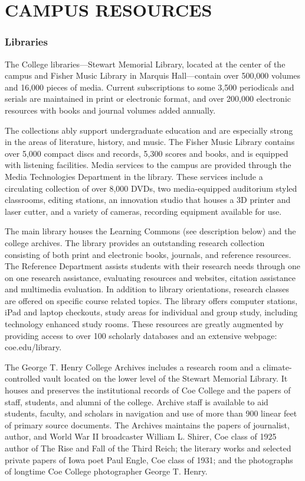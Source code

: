 \documentclass[
  letterpaper,
]{scrbook}
\begin{document}
\hypertarget{campus-resources-1}{%
\chapter{CAMPUS RESOURCES}\label{campus-resources-1}}

\hypertarget{libraries}{%
\subsection{Libraries}\label{libraries}}

The College libraries---Stewart Memorial Library, located at the center
of the campus and Fisher Music Library in Marquis Hall---contain over
500,000 volumes and 16,000 pieces of media. Current subscriptions to
some 3,500 periodicals and serials are maintained in print or electronic
format, and over 200,000 electronic resources with books and journal
volumes added annually.

The collections ably support undergraduate education and are especially
strong in the areas of literature, history, and music. The Fisher Music
Library contains over 5,000 compact discs and records, 5,300 scores and
books, and is equipped with listening facilities. Media services to the
campus are provided through the Media Technologies Department in the
library. These services include a circulating collection of over 8,000
DVDs, two media-equipped auditorium styled classrooms, editing stations,
an innovation studio that houses a 3D printer and laser cutter, and a
variety of cameras, recording equipment available for use.

The main library houses the Learning Commons (see description below) and
the college archives. The library provides an outstanding research
collection consisting of both print and electronic books, journals, and
reference resources. The Reference Department assists students with
their research needs through one on one research assistance, evaluating
resources and websites, citation assistance and multimedia evaluation.
In addition to library orientations, research classes are offered on
specific course related topics. The library offers computer stations,
iPad and laptop checkouts, study areas for individual and group study,
including technology enhanced study rooms. These resources are greatly
augmented by providing access to over 100 scholarly databases and an
extensive webpage: coe.edu/library.

The George T. Henry College Archives includes a research room and a
climate-controlled vault located on the lower level of the Stewart
Memorial Library. It houses and preserves the institutional records of
Coe College and the papers of staff, students, and alumni of the
college. Archive staff is available to aid students, faculty, and
scholars in navigation and use of more than 900 linear feet of primary
source documents. The Archives maintains the papers of journalist,
author, and World War II broadcaster William L. Shirer, Coe class of
1925 author of The Rise and Fall of the Third Reich; the literary works
and selected private papers of Iowa poet Paul Engle, Coe class of 1931;
and the photographs of longtime Coe College photographer George T.
Henry.
\end{document}
